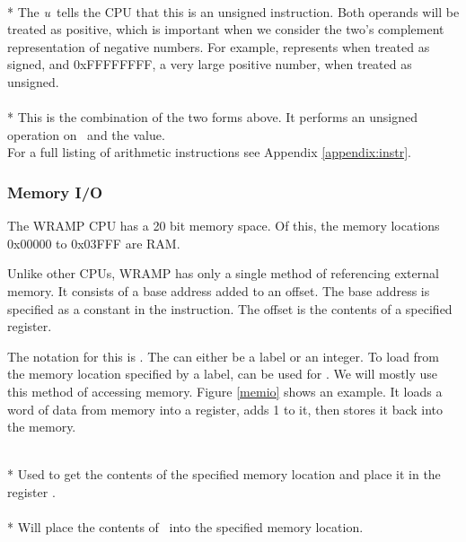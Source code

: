  \\* 
The \emph{u}\ tells the CPU that this is an unsigned instruction.
Both operands will be treated as positive, which is important when
we consider the two's complement representation of negative numbers.
For example, \mbox{} 
represents  when treated as signed, and 0xFFFFFFFF, a very 
large positive number, when treated as unsigned.
\\

 \\*
This is the combination of the two forms above. It performs an unsigned
operation on \regs\ and the  value.
\\

For a full listing of arithmetic instructions see Appendix
\ref{appendix:instr}.

\subsubsection{Memory I/O}
The WRAMP CPU has a 20 bit memory space. Of this, the memory locations 
0x00000 to 0x03FFF are RAM.

Unlike other CPUs, WRAMP has only a single method of referencing
external memory. It consists of a base address added to an offset.
The base address is specified as a constant in the instruction. The
offset is the contents of a specified register.

The notation for this is . The  can either
be a label or an integer. To load from the memory location specified
by a label,  can be used for \regs. We will mostly use this method
of accessing memory. Figure \ref{memio} shows an example.
It loads a word of data from memory into a register, adds 1 to it,
then stores it back into the memory.

\\*
Used to get the contents of the specified memory location and place it 
in the register \regd.
\\

\\*
Will place the contents of \regd\ into the specified memory location.
\\

